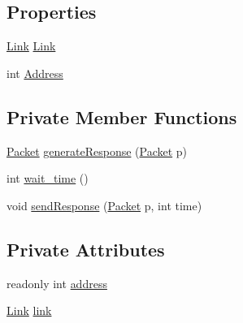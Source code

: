 \subsection*{Properties}
\begin{DoxyCompactItemize}
\item 
\hyperlink{classNetTrafficSimulator_1_1Link}{Link} \hyperlink{classNetTrafficSimulator_1_1ServerNode_a2fb3b251c8ad36760f68b8f7f4bc4c5b}{Link}
\item 
int \hyperlink{classNetTrafficSimulator_1_1ServerNode_a52165503cd66de69748e5e4e5b9cedd4}{Address}
\end{DoxyCompactItemize}
\subsection*{Private Member Functions}
\begin{DoxyCompactItemize}
\item 
\hyperlink{classNetTrafficSimulator_1_1Packet}{Packet} \hyperlink{classNetTrafficSimulator_1_1ServerNode_a96f3601328b5a86e3d69dcf93abafb34}{generate\-Response} (\hyperlink{classNetTrafficSimulator_1_1Packet}{Packet} p)
\item 
int \hyperlink{classNetTrafficSimulator_1_1ServerNode_a95a09cca40cf33abb200fa8c704f00a3}{wait\-\_\-time} ()
\item 
void \hyperlink{classNetTrafficSimulator_1_1ServerNode_ae90b2eb0a3abc8449a790a388dc1bcbb}{send\-Response} (\hyperlink{classNetTrafficSimulator_1_1Packet}{Packet} p, int time)
\end{DoxyCompactItemize}
\subsection*{Private Attributes}
\begin{DoxyCompactItemize}
\item 
readonly int \hyperlink{classNetTrafficSimulator_1_1ServerNode_a8be317d1e315710190755e4560fea3ef}{address}
\item 
\hyperlink{classNetTrafficSimulator_1_1Link}{Link} \hyperlink{classNetTrafficSimulator_1_1ServerNode_a3968056516ee0dcb5ae111d09464efe6}{link}
\end{DoxyCompactItemize}


